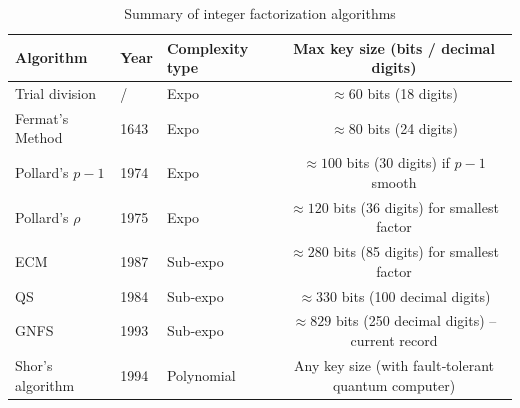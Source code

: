 \begin{table}[htbp]
\centering
\caption*{Summary of integer factorization algorithms}
\small   %
\setlength{\tabcolsep}{4pt}   %
\begin{tabular}{@{}lllc@{}}
\toprule
\textbf{Algorithm} & \textbf{Year} & \textbf{Complexity type} & \textbf{Max key size (bits / decimal digits)} \\
\midrule
Trial division & / & Expo & \(\approx 60\) bits (18 digits) \\
Fermat's Method & 1643 & Expo & \(\approx 80\) bits (24 digits) \\
Pollard's \(p-1\) & 1974 & Expo & \(\approx 100\) bits (30 digits) if \(p-1\) smooth \\
Pollard's \(\rho\)  & 1975 & Expo & \(\approx 120\) bits (36 digits) for smallest factor \\
 ECM & 1987 & Sub‑expo & \(\approx 280\) bits (85 digits) for smallest factor \\
 QS & 1984 & Sub‑expo & \(\approx 330\) bits (100 decimal digits) \\
 GNFS & 1993 & Sub‑expo & \(\approx 829\) bits (250 decimal digits) -- current record \\
Shor's algorithm  & 1994 & Polynomial & Any key size (with fault‑tolerant quantum computer) \\
\bottomrule
\end{tabular}
\end{table}